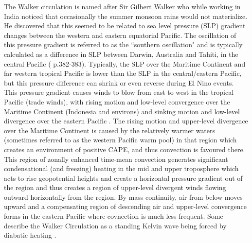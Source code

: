 \documentclass[letterpaper,12pt,titlepage,oneside,final]{book}
\begin{document}
The Walker circulation is named after Sir Gilbert Walker who while working in India noticed that occasionally the summer monsoon rains would not materialize. He discovered that this seemed to be related to sea level pressure (SLP) gradient changes between the western and eastern equatorial Pacific. The oscillation of this pressure gradient is referred to as the ``southern oscillation" and is typically calculated as a difference in SLP between Darwin, Australia and Tahiti, in the central Pacific (\citep{holton_introduction_2004} p.382-383). Typically, the SLP over the Maritime Continent and far western tropical Pacific is lower than the SLP in the central/eastern Pacific, but this pressure difference can shrink or even reverse during El Nino events. This pressure gradient causes winds to blow from east to west in the tropical Pacific (trade winds), with rising motion and low-level convergence over the Maritime Continent (Indonesia and environs) and sinking motion and low-level divergence over the eastern Pacific \citep{bjerknes_atmospheric_1969}. The rising motion and upper-level divergence over the Maritime Continent is caused by the relatively warmer waters (sometimes referred to as the western Pacific warm pool) in that region which creates an environment of positive CAPE, and thus convection is favoured there. This region of zonally enhanced time-mean convection generates significant condensational (and freezing) heating in the mid and upper troposphere which acts to rise geopotential heights and create a horizontal pressure gradient out of the region and thus creates a region of upper-level divergent winds flowing outward horizontally from the region. By mass continuity, air from below moves upward and a compensating region of descending air and upper-level convergence forms in the eastern Pacific where covnection is much less frequent. Some describe the Walker Circulation as a standing Kelvin wave being forced by diabatic heating \citep{stechmann_walker_2014}. 
\end{document}
